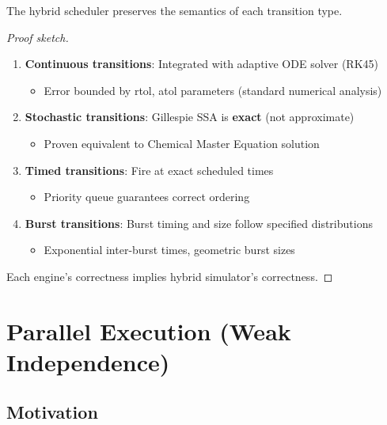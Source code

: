 \begin{theorem}
The hybrid scheduler preserves the semantics of each transition type.
\end{theorem}

\begin{proof}[Proof sketch]
\begin{enumerate}
    \item \textbf{Continuous transitions}: Integrated with adaptive ODE solver (RK45)
    \begin{itemize}
        \item Error bounded by rtol, atol parameters (standard numerical analysis)
    \end{itemize}
    
    \item \textbf{Stochastic transitions}: Gillespie SSA is \textbf{exact} (not approximate)
    \begin{itemize}
        \item Proven equivalent to Chemical Master Equation solution
    \end{itemize}
    
    \item \textbf{Timed transitions}: Fire at exact scheduled times
    \begin{itemize}
        \item Priority queue guarantees correct ordering
    \end{itemize}
    
    \item \textbf{Burst transitions}: Burst timing and size follow specified distributions
    \begin{itemize}
        \item Exponential inter-burst times, geometric burst sizes
    \end{itemize}
\end{enumerate}

Each engine's correctness implies hybrid simulator's correctness.
\end{proof}

\section{Parallel Execution (Weak Independence)}
\label{sec:parallel-execution}

\subsection{Motivation}
\label{subsec:parallel-motivation}


